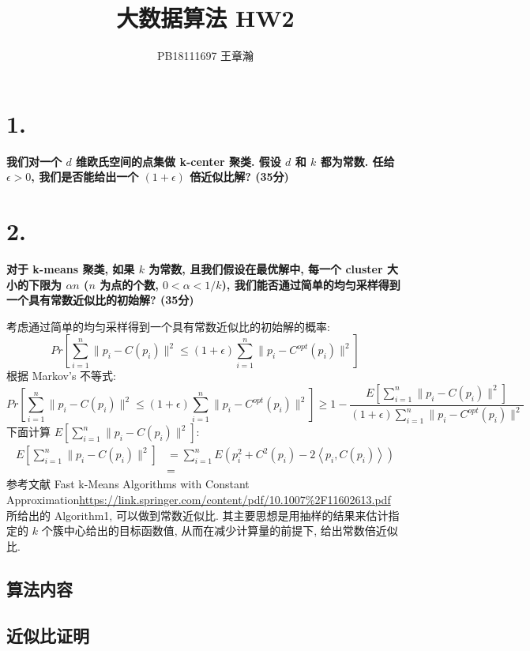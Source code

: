 \documentclass[UTF8]{article}
\title{大数据算法 HW2}
\author{PB18111697 王章瀚}
\newcommand{\jumpLine} {\hspace*{\fill} \par}
\begin{document}
\maketitle
\section*{1.}

\noindent \textbf{我们对一个 $d$ 维欧氏空间的点集做 k-center 聚类. 假设 $d$ 和 $k$ 都为常数. 任给 $\epsilon > 0$, 我们是否能给出一个 $(1 + \epsilon)$ 倍近似比解? (35分)}

\section*{2.}

\noindent \textbf{对于 k-means 聚类, 如果 $k$ 为常数, 且我们假设在最优解中, 每一个 cluster 大小的下限为 $\alpha n$ ($n$ 为点的个数, $0 < \alpha < 1/k$), 我们能否通过简单的均匀采样得到一个具有常数近似比的初始解? (35分)} \\\jumpLine\noindent
考虑通过简单的均匀采样得到一个具有常数近似比的初始解的概率:
$$Pr\left[ \sum\limits_{i=1}^n\|p_i-C(p_i)\|^2 \le (1+\epsilon)\sum\limits_{i=1}^n\|p_i-C^{opt}(p_i)\|^2\right]$$
根据 Markov's 不等式:
$$Pr\left[ \sum\limits_{i=1}^n\|p_i-C(p_i)\|^2 \le (1+\epsilon)\sum\limits_{i=1}^n\|p_i-C^{opt}(p_i)\|^2\right] \ge 1 - \frac{E\left[\sum\limits_{i=1}^n\|p_i-C(p_i)\|^2 \right]}{(1+\epsilon)\sum\limits_{i=1}^n\|p_i-C^{opt}(p_i)\|^2}$$
下面计算 $E\left[\sum\limits_{i=1}^n\|p_i-C(p_i)\|^2 \right]$:
\begin{align*}
	E\left[\sum\limits_{i=1}^n\|p_i-C(p_i)\|^2 \right]
	&= \sum\limits_{i=1}^n E\left( p_i^2 + C^2(p_i) - 2\left< p_i, C(p_i) \right> \right)\\
	&= 
\end{align*}
参考文献 Fast k-Means Algorithms with Constant Approximation\url{https://link.springer.com/content/pdf/10.1007%2F11602613.pdf} 所给出的 Algorithm1, 可以做到常数近似比. 其主要思想是用抽样的结果来估计指定的 $k$ 个簇中心给出的目标函数值, 从而在减少计算量的前提下, 给出常数倍近似比.

\subsection*{算法内容}

\subsection*{近似比证明}
\end{document}
